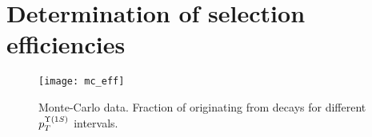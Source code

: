 
\section{Determination of selection efficiencies}
\label{sec:eff}


\begin{figure}[H]
  \centering
  \texttt{[image: mc\_eff]}
  \caption{
    \small  Monte-Carlo data. Fraction of \OneS originating from \chib decays for 
    different $p_{T}^{\OneS}$ intervals.
  }
  \label{fig:chib_fractions}
\end{figure}

